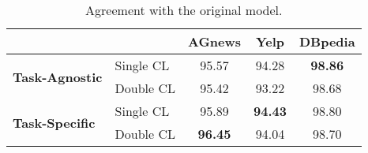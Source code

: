 \begin{table*}[h]
    \centering
    \begin{tabular}{|l|l|c|c|c|}
        \hline
        \multicolumn{2}{|c|}{} & \textbf{AGnews} & \textbf{Yelp} & \textbf{DBpedia} \\
        \hline
        \multirow{2}{*}{\textbf{Task-Agnostic}} & Single CL & 95.57 & 94.28 & \textbf{98.86} \\
        & Double CL & 95.42 & 93.22 & 98.68 \\
        \hline
        \multirow{2}{*}{\textbf{Task-Specific}} & Single CL & 95.89 & \textbf{94.43} & 98.80 \\
        & Double CL & \textbf{96.45} & 94.04 & 98.70 \\
        \hline
    \end{tabular}
    \caption{Agreement with the original model.}
    \label{tab:agreement_results}
\end{table*}